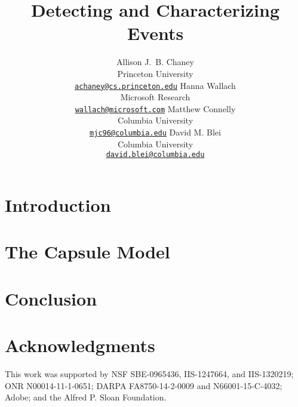\documentclass[11pt,letterpaper]{article}
\title{Detecting and Characterizing Events}
\author{
Allison J.~B. Chaney\\
    Princeton University\\
	\href{mailto:achaney@cs.princeton.edu}{\nolinkurl{achaney@cs.princeton.edu}}
\And
Hanna Wallach\\
    Microsoft Research\\
    \href{mailto:wallach@microsoft.com}{\nolinkurl{wallach@microsoft.com}}
\AND
Matthew Connelly\\
    Columbia University\\
    \href{mailto:mjc96@columbia.edu}{\nolinkurl{mjc96@columbia.edu}}
\And
David M. Blei\\
    Columbia University\\
    \href{mailto:david.blei@columbia.edu}{\nolinkurl{david.blei@columbia.edu}}
}
\date{}
\begin{document}
\maketitle

\begin{abstract}

\end{abstract}


\section{Introduction}
\label{sec:intro}


\section{The Capsule Model}
\label{sec:model}




\section{Conclusion}
\label{sec:discussion}




\section*{Acknowledgments}

This work was supported by NSF SBE-0965436, IIS-1247664, and
IIS-1320219; ONR N00014-11-1-0651; DARPA FA8750-14-2-0009 and
N66001-15-C-4032; Adobe; and the Alfred P. Sloan Foundation.




\end{document}
